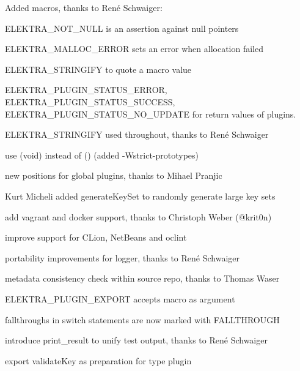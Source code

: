 \begin{DoxyItemize}
\item Added macros, thanks to René Schwaiger\+:
\begin{DoxyItemize}
\item {\ttfamily E\+L\+E\+K\+T\+R\+A\+\_\+\+N\+O\+T\+\_\+\+N\+U\+LL} is an assertion against null pointers
\item {\ttfamily E\+L\+E\+K\+T\+R\+A\+\_\+\+M\+A\+L\+L\+O\+C\+\_\+\+E\+R\+R\+OR} sets an error when allocation failed
\item {\ttfamily E\+L\+E\+K\+T\+R\+A\+\_\+\+S\+T\+R\+I\+N\+G\+I\+FY} to quote a macro value
\item {\ttfamily E\+L\+E\+K\+T\+R\+A\+\_\+\+P\+L\+U\+G\+I\+N\+\_\+\+S\+T\+A\+T\+U\+S\+\_\+\+E\+R\+R\+OR}, {\ttfamily E\+L\+E\+K\+T\+R\+A\+\_\+\+P\+L\+U\+G\+I\+N\+\_\+\+S\+T\+A\+T\+U\+S\+\_\+\+S\+U\+C\+C\+E\+SS}, {\ttfamily E\+L\+E\+K\+T\+R\+A\+\_\+\+P\+L\+U\+G\+I\+N\+\_\+\+S\+T\+A\+T\+U\+S\+\_\+\+N\+O\+\_\+\+U\+P\+D\+A\+TE} for return values of plugins.
\end{DoxyItemize}
\item {\ttfamily E\+L\+E\+K\+T\+R\+A\+\_\+\+S\+T\+R\+I\+N\+G\+I\+FY} used throughout, thanks to René Schwaiger
\item use {\ttfamily (void)} instead of {\ttfamily ()} (added {\ttfamily -\/Wstrict-\/prototypes})
\item new positions for global plugins, thanks to Mihael Pranjic
\item Kurt Micheli added {\ttfamily generate\+Key\+Set} to randomly generate large key sets
\item add vagrant and docker support, thanks to Christoph Weber (@krit0n)
\item improve support for C\+Lion, Net\+Beans and {\ttfamily oclint}
\item portability improvements for logger, thanks to René Schwaiger
\item metadata consistency check within source repo, thanks to Thomas Waser
\item {\ttfamily E\+L\+E\+K\+T\+R\+A\+\_\+\+P\+L\+U\+G\+I\+N\+\_\+\+E\+X\+P\+O\+RT} accepts macro as argument
\item fallthroughs in switch statements are now marked with {\ttfamily F\+A\+L\+L\+T\+H\+R\+O\+U\+GH}
\item introduce {\ttfamily print\+\_\+result} to unify test output, thanks to René Schwaiger
\item export {\ttfamily validate\+Key} as preparation for type plugin
\end{DoxyItemize}

